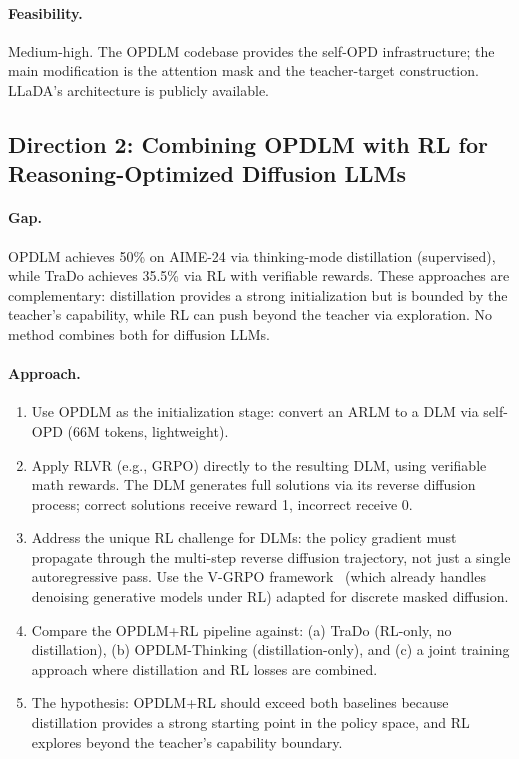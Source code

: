 \documentclass[11pt,a4paper]{article}
\begin{document}
\paragraph{Feasibility.} Medium-high. The OPDLM codebase provides the self-OPD infrastructure; the main modification is the attention mask and the teacher-target construction. LLaDA's architecture is publicly available.

\subsection{Direction 2: Combining OPDLM with RL for Reasoning-Optimized Diffusion LLMs}

\paragraph{Gap.} OPDLM achieves 50\% on AIME-24 via thinking-mode distillation (supervised), while TraDo achieves 35.5\% via RL with verifiable rewards. These approaches are complementary: distillation provides a strong initialization but is bounded by the teacher's capability, while RL can push beyond the teacher via exploration. No method combines both for diffusion LLMs.

\paragraph{Approach.}
\begin{enumerate}
\item Use OPDLM as the initialization stage: convert an ARLM to a DLM via self-OPD (66M tokens, lightweight).
\item Apply RLVR (e.g., GRPO) directly to the resulting DLM, using verifiable math rewards. The DLM generates full solutions via its reverse diffusion process; correct solutions receive reward 1, incorrect receive 0.
\item Address the unique RL challenge for DLMs: the policy gradient must propagate through the multi-step reverse diffusion trajectory, not just a single autoregressive pass. Use the V-GRPO framework~\cite{vgrpo2026} (which already handles denoising generative models under RL) adapted for discrete masked diffusion.
\item Compare the OPDLM+RL pipeline against: (a) TraDo (RL-only, no distillation), (b) OPDLM-Thinking (distillation-only), and (c) a joint training approach where distillation and RL losses are combined.
\item The hypothesis: OPDLM+RL should exceed both baselines because distillation provides a strong starting point in the policy space, and RL explores beyond the teacher's capability boundary.
\end{enumerate}
\end{document}
